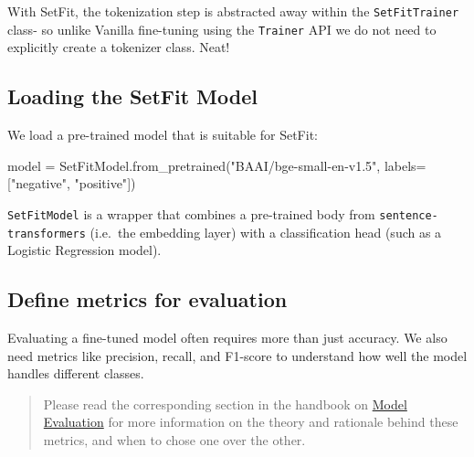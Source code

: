 \documentclass[
  letterpaper,
  DIV=11,
  numbers=noendperiod]{scrreprt}
\newenvironment{Shaded}{\begin{snugshade}}{\end{snugshade}}
\newcommand{\NormalTok}[1]{\textcolor[rgb]{0.00,0.23,0.31}{#1}}
\newcommand{\OperatorTok}[1]{\textcolor[rgb]{0.37,0.37,0.37}{#1}}
\newcommand{\StringTok}[1]{\textcolor[rgb]{0.13,0.47,0.30}{#1}}
\begin{document}
\begin{tcolorbox}[enhanced jigsaw, opacitybacktitle=0.6, breakable, title=\textcolor{quarto-callout-note-color}{\faInfo}\hspace{0.5em}{What about Tokenization?}, arc=.35mm, colframe=quarto-callout-note-color-frame, colbacktitle=quarto-callout-note-color!10!white, left=2mm, bottomrule=.15mm, opacityback=0, toprule=.15mm, bottomtitle=1mm, toptitle=1mm, titlerule=0mm, leftrule=.75mm, colback=white, rightrule=.15mm, coltitle=black]

With SetFit, the tokenization step is abstracted away within the
\texttt{SetFitTrainer} class- so unlike Vanilla fine-tuning using the
\texttt{Trainer} API we do not need to explicitly create a tokenizer
class. Neat!

\end{tcolorbox}

\subsection{Loading the SetFit Model}\label{loading-the-setfit-model}

We load a pre-trained model that is suitable for SetFit:

\begin{Shaded}
\begin{Highlighting}[]
\NormalTok{model }\OperatorTok{=}\NormalTok{ SetFitModel.from\_pretrained(}\StringTok{"BAAI/bge{-}small{-}en{-}v1.5"}\NormalTok{,}
\NormalTok{labels}\OperatorTok{=}\NormalTok{[}\StringTok{"negative"}\NormalTok{, }\StringTok{"positive"}\NormalTok{])}
\end{Highlighting}
\end{Shaded}

\texttt{SetFitModel} is a wrapper that combines a pre-trained body from
\texttt{sentence-transformers} (i.e.~the embedding layer) with a
classification head (such as a Logistic Regression model).

\subsection{Define metrics for
evaluation}\label{define-metrics-for-evaluation}

Evaluating a fine-tuned model often requires more than just accuracy. We
also need metrics like precision, recall, and F1-score to understand how
well the model handles different classes.

\begin{quote}
Please read the corresponding section in the handbook on
\href{./model_evaluation.qmd}{Model Evaluation} for more information on
the theory and rationale behind these metrics, and when to chose one
over the other.
\end{quote}
\end{document}
